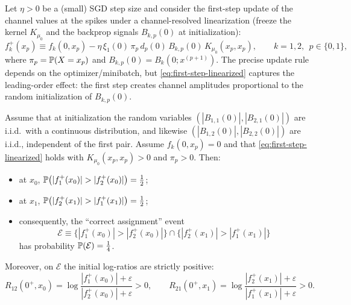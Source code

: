 Let $\eta>0$ be a (small) SGD step size and consider the first-step update of the channel values at the spikes under a channel-resolved linearization (freeze the kernel $K_{\mu_0}$ and the backprop signals $B_{k,p}(0)$ at initialization):
\begin{equation}\label{eq:first-step-linearized}
f_k^{+}(x_p)\equiv f_k(0,x_p)-\eta\,\xi_1(0)\,\pi_p\,d_p(0)\,B_{k,p}(0)\,K_{\mu_0}(x_p,x_p),
\qquad k=1,2,\ \ p\in\{0,1\},
\end{equation}
where $\pi_p=\mathbb{P}(X=x_p)$ and $B_{k,p}(0)=B_k(0;x^{(p+1)})$.
The precise update rule depends on the optimizer/minibatch, but \eqref{eq:first-step-linearized} captures the leading-order effect: the first step creates channel amplitudes proportional to the random initialization of $B_{k,p}(0)$.

\begin{lemma}\label{lem:first-step-dominance}
\provedflag
Assume that at initialization the random variables $(|B_{1,1}(0)|,|B_{2,1}(0)|)$ are i.i.d.\ with a continuous distribution, and likewise $(|B_{1,2}(0)|,|B_{2,2}(0)|)$ are i.i.d., independent of the first pair.
Assume $f_k(0,x_p)=0$ and that \eqref{eq:first-step-linearized} holds with $K_{\mu_0}(x_p,x_p)>0$ and $\pi_p>0$.
Then:
\begin{itemize}
\item at $x_0$, $\Pp\big(|f_1^{+}(x_0)|>|f_2^{+}(x_0)|\big)=\tfrac12$;
\item at $x_1$, $\Pp\big(|f_2^{+}(x_1)|>|f_1^{+}(x_1)|\big)=\tfrac12$;
\item consequently, the ``correct assignment'' event
\[
\mathcal{E}\equiv \{|f_1^{+}(x_0)|>|f_2^{+}(x_0)|\}\cap \{|f_2^{+}(x_1)|>|f_1^{+}(x_1)|\}
\]
has probability $\mathbb{P}(\mathcal{E})=\tfrac14$.
\end{itemize}
Moreover, on $\mathcal{E}$ the initial log-ratios are strictly positive:
\[
R_{12}(0^{+},x_0)=\log\frac{|f_1^{+}(x_0)|+\varepsilon}{|f_2^{+}(x_0)|+\varepsilon}>0,\qquad
R_{21}(0^{+},x_1)=\log\frac{|f_2^{+}(x_1)|+\varepsilon}{|f_1^{+}(x_1)|+\varepsilon}>0.
\]
\end{lemma}

